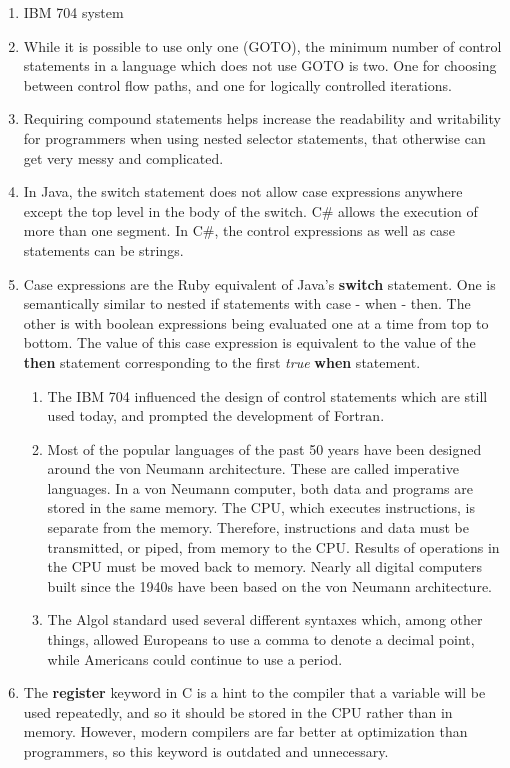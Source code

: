 \documentclass{article}
\begin{document}
  \begin{enumerate}
\item IBM 704 system
\item While it is possible to use only one (GOTO), the minimum number of control statements in a language which does not use GOTO is two. One for choosing between control flow paths, and one for logically controlled iterations.
\item Requiring compound statements helps increase the readability and writability for programmers when using nested selector statements, that otherwise can get very messy and complicated.
\item In Java, the switch statement does not allow case expressions anywhere except the top level in the body of the switch.  C\#  allows the execution of more than one segment. In C\#, the control expressions as well as case statements can be strings.
\item Case expressions are the Ruby equivalent of Java's \textbf{switch} statement. One is semantically similar to nested if statements with case - when - then. The other is with boolean expressions being evaluated one at a time from top to bottom. The value of this case expression is equivalent to the value of the \textbf{then} statement corresponding to the first \textit{true} \textbf{when} statement.
\begin{enumerate}
\item The IBM 704 influenced the design of control statements which are still used today, and prompted the development of Fortran.
\item Most of the popular languages of the past 50 years have been designed around the von Neumann architecture. These are called imperative languages. In a von Neumann computer, both data and programs are stored in the same memory. The CPU, which executes instructions, is separate from the memory. Therefore, instructions and data must be transmitted, or piped, from memory to the CPU. Results of operations in the CPU must be moved back to memory. Nearly all digital computers built since the 1940s have been based on the von Neumann architecture.
\item The Algol standard used several different syntaxes which, among other things, allowed Europeans to use a comma to denote a decimal point, while Americans could continue to use a period.
\end{enumerate}
\item The \textbf{register} keyword in C is a hint to the compiler that a variable will be used repeatedly, and so it should be stored in the CPU rather than in memory. However, modern compilers are far better at optimization than programmers, so this keyword is outdated and unnecessary.

\end{enumerate}
\end{document}
